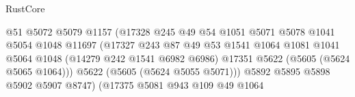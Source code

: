 \begin{lexlean}{RustCore}
\begin{coremodule}
                                                  @51
                                                  @5072
                                                  @5079
                                                  @1157
                                                  (@17328
                                                    @245
                                                    @49
                                                    @54
                                                    @1051
                                                    @5071
                                                    @5078
                                                    @1041
                                                    @5054
                                                    @1048
                                                    @11697
                                                    (@17327
                                                      @243
                                                      @87
                                                      @49
                                                      @53
                                                      @1541
                                                      @1064
                                                      @1081
                                                      @1041
                                                      @5064
                                                      @1048
                                                      (@14279 @242 @1541 @6982 @6986)
                                                      @17351
                                                      @5622
                                                      (@5605 (@5624 @5065 @1064)))
                                                    @5622
                                                    (@5605 (@5624 @5055 @5071)))
                                                  @5892
                                                  @5895
                                                  @5898
                                                  @5902
                                                  @5907
                                                  @8747)
                                                (@17375
                                                  @5081
                                                  @943
                                                  @109
                                                  @49
                                                  @1064

\end{coremodule}
\end{lexlean}
